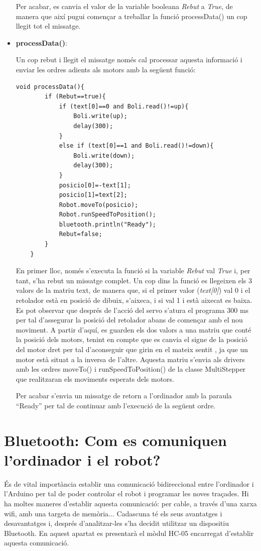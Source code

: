 \begin{itemize}
	Per acabar, es canvia el valor de la variable booleana \emph{Rebut} a \emph{True}, de manera que així pugui començar a treballar la funció processData() un cop llegit tot el missatge. 
	
	\item \textbf{processData()}:
	
	Un cop rebut i llegit el missatge només cal processar aquesta informació i enviar les ordres adients als motors amb la següent funció:
	
	\begin{lstlisting}[style=Arduino]
	void processData(){
		if (Rebut==true){
			if (text[0]==0 and Boli.read()!=up){
				Boli.write(up);
				delay(300);
			}
			else if (text[0]==1 and Boli.read()!=down){
				Boli.write(down);
				delay(300);
			}
			posicio[0]=-text[1];
			posicio[1]=text[2];
			Robot.moveTo(posicio);
			Robot.runSpeedToPosition();
			bluetooth.println("Ready");
			Rebut=false; 
		}
	}
	\end{lstlisting}
	
	En primer lloc, només s’executa la funció si la variable \emph{Rebut} val \emph{True} i, per tant, s’ha rebut un missatge complet. Un cop dins la funció es llegeixen els 3 valors de la matriu text, de manera que, si el primer valor (\emph{text[0]}) val 0 i el retolador està en posició de dibuix, s’aixeca, i si val 1 i està aixecat es baixa. Es pot observar que després de l’acció del servo s’atura el programa 300 ms per tal d’assegurar la posició del retolador abans de començar amb el nou moviment. A partir d’aquí, es guarden els dos valors a una matriu que conté la posició dels motors, tenint en compte que es canvia el signe de la posició del motor dret per tal d’aconseguir que girin en el mateix sentit , ja que un motor està situat a la inversa de l’altre. Aquesta matriu s’envia als drivers amb les ordres moveTo() i runSpeedToPosition() de la classe MultiStepper que realitzaran els moviments esperats dels motors. 
	
	Per acabar s’envia un missatge de retorn a l’ordinador amb la paraula “Ready” per tal de continuar amb l’execució de la següent ordre. 
	
	
\end{itemize}

\section{Bluetooth: Com es comuniquen l'ordinador i el robot?}

És de vital importància establir una comunicació bidireccional entre l’ordinador i l’Arduino per tal de poder controlar el robot i programar les noves traçades. Hi ha moltes maneres d’establir aquesta comunicació: per cable, a través d’una xarxa wifi, amb una targeta de memòria... Cadascuna té els seus avantatges i desavantatges i, després d’analitzar-les s’ha decidit utilitzar un dispositiu Bluetooth. En aquest apartat es presentarà el mòdul HC-05 encarregat d’establir aquesta comunicació.

